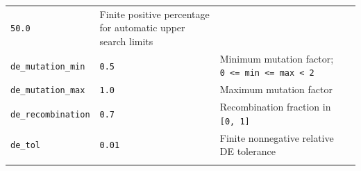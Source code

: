 \documentclass[
  10pt,
  a4paper,
  oneside]{scrreprt}
\begin{document}
\begin{longtable}[]{@{}lll@{}}
\begin{minipage}[t]{0.30\columnwidth}
\texttt{50.0}\strut
\end{minipage} & \begin{minipage}[t]{0.30\columnwidth}\raggedright
Finite positive percentage for automatic upper search limits\strut
\end{minipage}\tabularnewline
\begin{minipage}[t]{0.30\columnwidth}\raggedright
\texttt{de\_mutation\_min}\strut
\end{minipage} & \begin{minipage}[t]{0.30\columnwidth}\raggedright
\texttt{0.5}\strut
\end{minipage} & \begin{minipage}[t]{0.30\columnwidth}\raggedright
Minimum mutation factor;
\texttt{0\ \textless{}=\ min\ \textless{}=\ max\ \textless{}\ 2}\strut
\end{minipage}\tabularnewline
\begin{minipage}[t]{0.30\columnwidth}\raggedright
\texttt{de\_mutation\_max}\strut
\end{minipage} & \begin{minipage}[t]{0.30\columnwidth}\raggedright
\texttt{1.0}\strut
\end{minipage} & \begin{minipage}[t]{0.30\columnwidth}\raggedright
Maximum mutation factor\strut
\end{minipage}\tabularnewline
\begin{minipage}[t]{0.30\columnwidth}\raggedright
\texttt{de\_recombination}\strut
\end{minipage} & \begin{minipage}[t]{0.30\columnwidth}\raggedright
\texttt{0.7}\strut
\end{minipage} & \begin{minipage}[t]{0.30\columnwidth}\raggedright
Recombination fraction in \texttt{{[}0,\ 1{]}}\strut
\end{minipage}\tabularnewline
\begin{minipage}[t]{0.30\columnwidth}\raggedright
\texttt{de\_tol}\strut
\end{minipage} & \begin{minipage}[t]{0.30\columnwidth}\raggedright
\texttt{0.01}\strut
\end{minipage} & \begin{minipage}[t]{0.30\columnwidth}\raggedright
Finite nonnegative relative DE tolerance\strut
\end{minipage}\tabularnewline
\begin{minipage}[t]{0.30\columnwidth}\raggedright

\end{minipage}
\end{longtable}
\end{document}
